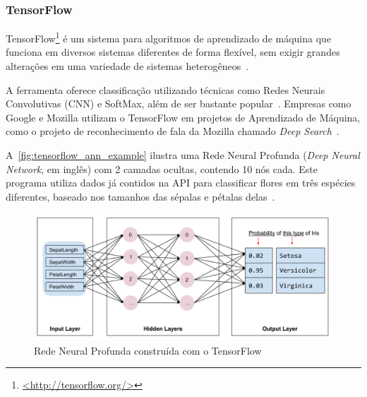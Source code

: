 
\subsubsection{TensorFlow}\label{sec:ml_tf}

TensorFlow\footnote{\href{http://tensorflow.org/}{<http://tensorflow.org/>}} é um sistema para algoritmos de aprendizado de máquina que funciona em diversos sistemas diferentes de forma flexível, sem exigir grandes alterações em uma variedade de sistemas heterogêneos~\cite{abadi:2016}.

A ferramenta oferece classificação utilizando técnicas como Redes Neurais Convolutivas (CNN) e SoftMax, além de ser bastante popular~\cite{ertram:2017}. Empresas como Google e Mozilla utilizam o TensorFlow em projetos de Aprendizado de Máquina, como o projeto de reconhecimento de fala da Mozilla chamado \textit{Deep Search}~\cite{tensorflow:uses}.

A~\autoref{fig:tensorflow_ann_example} ilustra uma Rede Neural Profunda (\textit{Deep Neural Network}, em inglês) com 2 camadas ocultas, contendo 10 nós cada. Este programa utiliza dados já contidos na API para classificar flores em três espécies diferentes, baseado nos tamanhos das sépalas e pétalas delas~\cite{tensorflow:premade_estimators}.

\begin{figure}[ht]
	\caption{\label{fig:tensorflow_ann_example}Rede Neural Profunda construída com o TensorFlow}
	\begin{center}
	    \includegraphics[width=\textwidth]{resources/tensorflow_ann_example}
	\end{center}
\end{figure}


